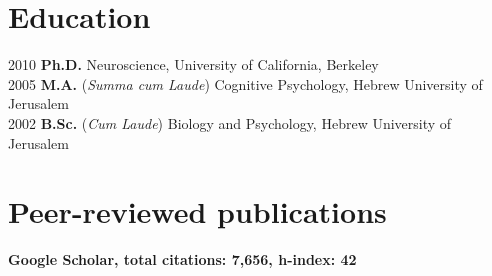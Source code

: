 \documentclass[11pt,fullpage]{article}
\begin{document}
\section*{Education}

	2010  {\bf Ph.D. } Neuroscience, University of California, Berkeley \\
	2005  {\bf M.A.} (\emph{Summa cum Laude}) Cognitive Psychology, Hebrew University of Jerusalem \\
	2002  {\bf B.Sc.} (\emph{Cum Laude}) Biology and Psychology, Hebrew University of Jerusalem \\


\section*{Peer-reviewed publications}

\textbf{Google Scholar, total citations: 7,656, h-index: 42}
\end{document}
